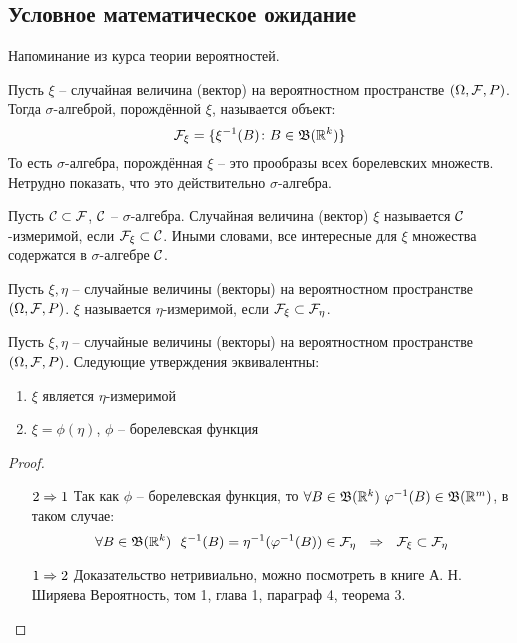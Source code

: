 \subsection{Условное математическое ожидание}

\begin{note}
    Напоминание из курса теории вероятностей.
\end{note}

\begin{definition}
    Пусть $\xi$ -- случайная величина (вектор) на вероятностном пространстве $(\Omega, \mathcal{F}, P)$. Тогда $\sigma$-алгеброй, порождённой $\xi$, называется объект:
    \[
        \mathcal{F}_\xi = \{\xi^{-1}(B) \colon B \in \mathfrak{B}(\mathbb{R}^k)\}
    \]
    То есть $\sigma$-алгебра, порождённая $\xi$ -- это прообразы всех борелевских множеств. Нетрудно показать, что это действительно $\sigma$-алгебра.
\end{definition}

\begin{definition}
    Пусть $\mathcal{C} \subset \mathcal{F}$, $\mathcal{C}$ -- $\sigma$-алгебра. Случайная величина (вектор) $\xi$ называется $\mathcal{C}$-измеримой, если $\mathcal{F}_\xi \subset \mathcal{C}$. Иными словами, все интересные для $\xi$ множества содержатся в $\sigma$-алгебре $\mathcal{C}$.
\end{definition}

\begin{definition}
    Пусть $\xi, \eta$ -- случайные величины (векторы) на вероятностном пространстве $(\Omega, \mathcal{F}, P)$. $\xi$ называется $\eta$-измеримой, если $\mathcal{F}_\xi \subset \mathcal{F}_\eta$.
\end{definition}

\begin{proposition}
    Пусть $\xi, \eta$ -- случайные величины (векторы) на вероятностном пространстве $(\Omega, \mathcal{F}, P)$. Следующие утверждения эквивалентны:
    \begin{enumerate}
        \item $\xi$ является $\eta$-измеримой
        \item $\xi = \phi(\eta)$, $\phi$ -- борелевская функция
    \end{enumerate}
\end{proposition}

\begin{proof}~
    \begin{itemize}
        \item[$2 \Rightarrow 1$] Так как $\phi$ -- борелевская функция, то $\forall B \in \mathfrak{B}(\mathbb{R}^k) \ \varphi^{-1}(B) \in \mathfrak{B}(\mathbb{R}^m)$, в таком случае:
        \[
            \forall B \in \mathfrak{B}(\mathbb{R}^k) \ \ \xi^{-1}(B) = \eta^{-1}(\varphi^{-1}(B)) \in \mathcal{F}_\eta \ \ \Rightarrow \ \ \mathcal{F}_\xi \subset \mathcal{F}_\eta
        \]

        \item[$1 \Rightarrow 2$] Доказательство нетривиально, можно посмотреть в книге А. Н. Ширяева Вероятность, том 1, глава 1, параграф 4, теорема 3.
    \end{itemize}
\end{proof}

